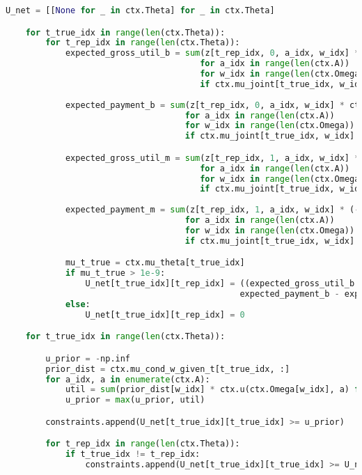 \begin{lstlisting}[language=Python,style=pythonstyle]
    U_net = [[None for _ in ctx.Theta] for _ in ctx.Theta]

    for t_true_idx in range(len(ctx.Theta)):
        for t_rep_idx in range(len(ctx.Theta)):
            expected_gross_util_b = sum(z[t_rep_idx, 0, a_idx, w_idx] * ctx.u(ctx.Omega[w_idx], ctx.A[a_idx])
                                       for a_idx in range(len(ctx.A))
                                       for w_idx in range(len(ctx.Omega))
                                       if ctx.mu_joint[t_true_idx, w_idx] > 0) 
            
            expected_payment_b = sum(z[t_rep_idx, 0, a_idx, w_idx] * ctx.b
                                    for a_idx in range(len(ctx.A))
                                    for w_idx in range(len(ctx.Omega))
                                    if ctx.mu_joint[t_true_idx, w_idx] > 0)

            expected_gross_util_m = sum(z[t_rep_idx, 1, a_idx, w_idx] * ctx.u(ctx.Omega[w_idx], ctx.A[a_idx])
                                       for a_idx in range(len(ctx.A))
                                       for w_idx in range(len(ctx.Omega))
                                       if ctx.mu_joint[t_true_idx, w_idx] > 0)
            
            expected_payment_m = sum(z[t_rep_idx, 1, a_idx, w_idx] * (-ctx.M)
                                    for a_idx in range(len(ctx.A))
                                    for w_idx in range(len(ctx.Omega))
                                    if ctx.mu_joint[t_true_idx, w_idx] > 0)

            mu_t_true = ctx.mu_theta[t_true_idx]
            if mu_t_true > 1e-9:
                U_net[t_true_idx][t_rep_idx] = ((expected_gross_util_b + expected_gross_util_m - 
                                               expected_payment_b - expected_payment_m) / mu_t_true)
            else:
                U_net[t_true_idx][t_rep_idx] = 0

    for t_true_idx in range(len(ctx.Theta)):

        u_prior = -np.inf
        prior_dist = ctx.mu_cond_w_given_t[t_true_idx, :]
        for a_idx, a in enumerate(ctx.A):
            util = sum(prior_dist[w_idx] * ctx.u(ctx.Omega[w_idx], a) for w_idx in range(len(ctx.Omega)))
            u_prior = max(u_prior, util)

        constraints.append(U_net[t_true_idx][t_true_idx] >= u_prior)

        for t_rep_idx in range(len(ctx.Theta)):
            if t_true_idx != t_rep_idx:
                constraints.append(U_net[t_true_idx][t_true_idx] >= U_net[t_true_idx][t_rep_idx])


\end{lstlisting}
